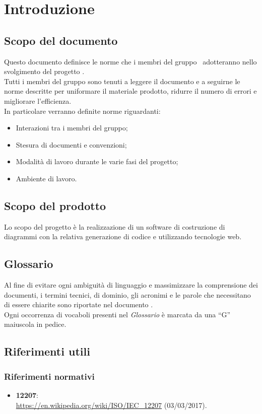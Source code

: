 \documentclass[../NormeDiProgetto.tex]{subfiles}
\begin{document}
	\section{Introduzione}
		\subsection{Scopo del documento}
			Questo documento definisce le norme che i membri del gruppo
			\kaleidoscode\ adotteranno nello svolgimento del progetto
			\progetto.\\
			Tutti i membri del gruppo sono tenuti a leggere il documento
			e a seguirne le norme descritte per uniformare il materiale
			prodotto, ridurre il numero di errori e migliorare l'efficienza.\\
			In particolare verranno definite norme riguardanti:
			\begin{itemize}
				\item Interazioni tra i membri del gruppo;
				\item Stesura di documenti e convenzioni;
				\item Modalità di lavoro durante le varie fasi del progetto;
				\item Ambiente di lavoro.
			\end{itemize}
		\subsection{Scopo del prodotto}
			Lo scopo del progetto è la realizzazione di un software di
			costruzione di diagrammi  con la relativa generazione
			di codice  e  utilizzando tecnologie
			web.
		\subsection{Glossario}
			Al fine di evitare ogni ambiguità di linguaggio e massimizzare la
			comprensione dei documenti, i termini tecnici, di dominio, gli
			acronimi e le parole che necessitano di essere chiarite sono
			riportate nel documento \glossariov.\\
			Ogni occorrenza di vocaboli presenti nel \textit{Glossario} è
			marcata da una ``G'' maiuscola in pedice.
		\subsection{Riferimenti utili}
			\subsubsection{Riferimenti normativi}
    			\begin{itemize}
    				\item \textbf{ 12207}:\\
    				\url{https://en.wikipedia.org/wiki/ISO/IEC_12207} (03/03/2017).
				\end{itemize}
\end{document}
